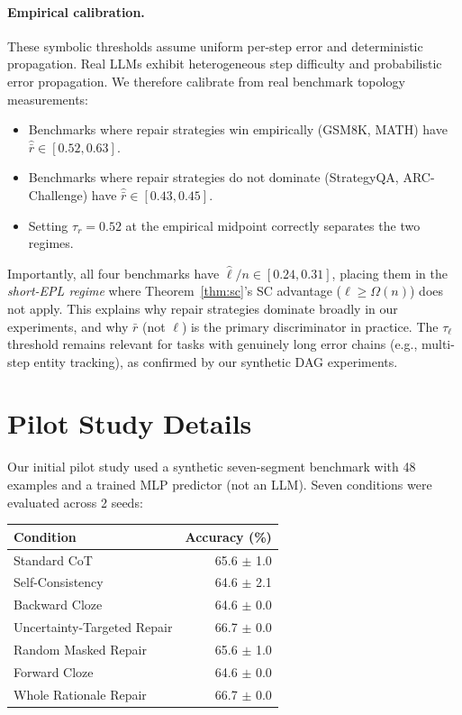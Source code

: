 \documentclass{article}
\begin{document}
\paragraph{Empirical calibration.} These symbolic thresholds assume uniform per-step error and deterministic propagation. Real LLMs exhibit heterogeneous step difficulty and probabilistic error propagation. We therefore calibrate from real benchmark topology measurements:
\begin{itemize}[nosep]
\item Benchmarks where repair strategies win empirically (GSM8K, MATH) have $\hat{\bar{r}} \in [0.52, 0.63]$.
\item Benchmarks where repair strategies do not dominate (StrategyQA, ARC-Challenge) have $\hat{\bar{r}} \in [0.43, 0.45]$.
\item Setting $\tau_r = 0.52$ at the empirical midpoint correctly separates the two regimes.
\end{itemize}
Importantly, all four benchmarks have $\hat{\ell}/n \in [0.24, 0.31]$, placing them in the \emph{short-EPL regime} where Theorem~\ref{thm:sc}'s SC advantage ($\ell \geq \Omega(n)$) does not apply. This explains why repair strategies dominate broadly in our experiments, and why $\bar{r}$ (not $\ell$) is the primary discriminator in practice. The $\tau_\ell$ threshold remains relevant for tasks with genuinely long error chains (e.g., multi-step entity tracking), as confirmed by our synthetic DAG experiments.

\section{Pilot Study Details}
\label{app:pilot}

Our initial pilot study used a synthetic seven-segment benchmark with 48 examples and a trained MLP predictor (not an LLM). Seven conditions were evaluated across 2 seeds:

\begin{center}
\small
\begin{tabular}{lr}
\toprule
\textbf{Condition} & \textbf{Accuracy (\%)} \\
\midrule
Standard CoT & 65.6 $\pm$ 1.0 \\
Self-Consistency & 64.6 $\pm$ 2.1 \\
Backward Cloze & 64.6 $\pm$ 0.0 \\
Uncertainty-Targeted Repair & 66.7 $\pm$ 0.0 \\
Random Masked Repair & 65.6 $\pm$ 1.0 \\
Forward Cloze & 64.6 $\pm$ 0.0 \\
Whole Rationale Repair & 66.7 $\pm$ 0.0 \\
\bottomrule
\end{tabular}
\end{center}
\end{document}
